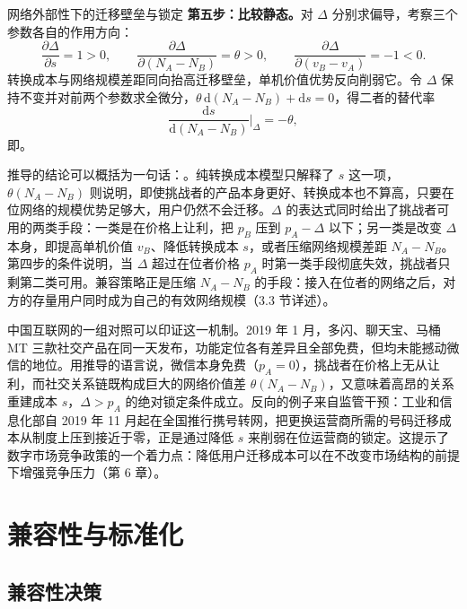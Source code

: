 \begin{derivation}{网络外部性下的迁移壁垒与锁定}{}
\textbf{第五步：比较静态。}对 $\Delta$ 分别求偏导，考察三个参数各自的作用方向：
\[
\frac{\partial \Delta}{\partial s} = 1 > 0, \qquad
\frac{\partial \Delta}{\partial (N_A - N_B)} = \theta > 0, \qquad
\frac{\partial \Delta}{\partial (v_B - v_A)} = -1 < 0.
\]
转换成本与网络规模差距同向抬高迁移壁垒，单机价值优势反向削弱它。令 $\Delta$ 保持不变并对前两个参数求全微分，$\theta \,\mathrm{d}(N_A - N_B) + \mathrm{d}s = 0$，得二者的替代率
\[
\frac{\mathrm{d}s}{\mathrm{d}(N_A - N_B)} \bigg|_{\Delta} = -\theta,
\]
即。
\end{derivation}

推导的结论可以概括为一句话：。纯转换成本模型只解释了 $s$ 这一项，$\theta(N_A - N_B)$ 则说明，即使挑战者的产品本身更好、转换成本也不算高，只要在位网络的规模优势足够大，用户仍然不会迁移。$\Delta$ 的表达式同时给出了挑战者可用的两类手段：一类是在价格上让利，把 $p_B$ 压到 $p_A - \Delta$ 以下；另一类是改变 $\Delta$ 本身，即提高单机价值 $v_B$、降低转换成本 $s$，或者压缩网络规模差距 $N_A - N_B$。第四步的条件说明，当 $\Delta$ 超过在位者价格 $p_A$ 时第一类手段彻底失效，挑战者只剩第二类可用。兼容策略正是压缩 $N_A - N_B$ 的手段：接入在位者的网络之后，对方的存量用户同时成为自己的有效网络规模（3.3 节详述）。

中国互联网的一组对照可以印证这一机制。2019 年 1 月，多闪、聊天宝、马桶 MT 三款社交产品在同一天发布，功能定位各有差异且全部免费，但均未能撼动微信的地位。用推导的语言说，微信本身免费（$p_A = 0$），挑战者在价格上无从让利，而社交关系链既构成巨大的网络价值差 $\theta(N_A - N_B)$，又意味着高昂的关系重建成本 $s$，$\Delta > p_A$ 的绝对锁定条件成立。反向的例子来自监管干预：工业和信息化部自 2019 年 11 月起在全国推行携号转网，把更换运营商所需的号码迁移成本从制度上压到接近于零，正是通过降低 $s$ 来削弱在位运营商的锁定。这提示了数字市场竞争政策的一个着力点：降低用户迁移成本可以在不改变市场结构的前提下增强竞争压力（第 6 章）。

\section{兼容性与标准化}

\subsection{兼容性决策}

